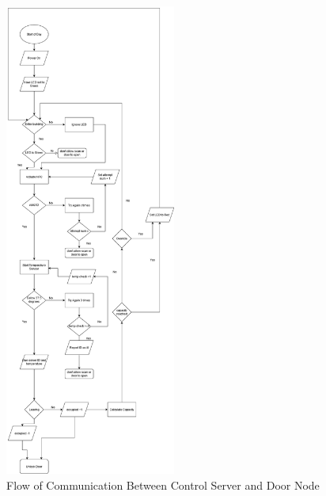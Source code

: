 \begin{figure}[!htb]
\centering
\includegraphics[width=0.5\textwidth]{images/server-door-msg-flow.png}
\caption{Flow of Communication Between Control Server and Door Node}
\end{figure}


